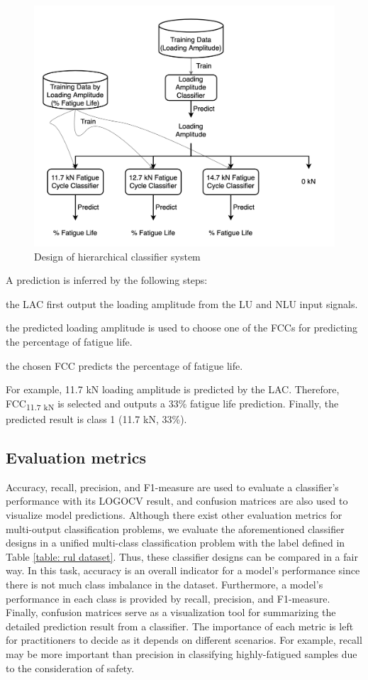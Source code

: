 \begin{figure}[tb]
    \centering
    \includegraphics[width=0.9\linewidth]{fig/hierarchical_classifier.png}
    \caption{Design of hierarchical classifier system}
    \label{fig: hierarchical classifier}
\end{figure}


A prediction is inferred by the following steps: 
\begin{enumerate*}[label=(\alph*)]
    \item the LAC first output the loading amplitude from the LU and NLU input signals.
    \item the predicted loading amplitude is used to choose one of the FCCs for predicting the percentage of fatigue life.
    \item the chosen FCC predicts the percentage of fatigue life.
\end{enumerate*}
For example, 11.7 kN loading amplitude is predicted by the LAC. Therefore, FCC\textsubscript{11.7 kN} is selected and outputs a 33\% fatigue life prediction. Finally, the predicted result is class 1 (11.7 kN, 33\%).

\subsection{Evaluation metrics}
Accuracy, recall, precision, and F1-measure are used to evaluate a classifier's performance with its LOGOCV result, and confusion matrices are also used to visualize model predictions. Although there exist other evaluation metrics for multi-output classification problems, we evaluate the aforementioned classifier designs in a unified multi-class classification problem with the label defined in Table \ref{table: rul dataset}. Thus, these classifier designs can be compared in a fair way. In this task, accuracy is an overall indicator for a model's performance since there is not much class imbalance in the dataset. Furthermore, a model's performance in each class is provided by recall, precision, and F1-measure. Finally, confusion matrices serve as a visualization tool for summarizing the detailed prediction result from a classifier. The importance of each metric is left for practitioners to decide as it depends on different scenarios. For example, recall may be more important than precision in classifying highly-fatigued samples due to the consideration of safety.

